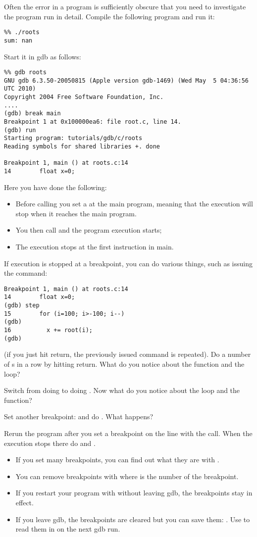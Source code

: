 Often the error in a program is sufficiently obscure that you need to
investigate the program run in detail. Compile the following program
%
%
and run it:
\begin{verbatim}
%% ./roots
sum: nan
\end{verbatim}
Start it in gdb as follows:
\begin{verbatim}
%% gdb roots
GNU gdb 6.3.50-20050815 (Apple version gdb-1469) (Wed May  5 04:36:56 UTC 2010)
Copyright 2004 Free Software Foundation, Inc.
....
(gdb) break main
Breakpoint 1 at 0x100000ea6: file root.c, line 14.
(gdb) run
Starting program: tutorials/gdb/c/roots
Reading symbols for shared libraries +. done

Breakpoint 1, main () at roots.c:14
14        float x=0;
\end{verbatim}
Here you have done the following:
\begin{itemize}
\item Before calling  you set a  at the
  main program, meaning that the execution will stop when it reaches
  the main program.
\item You then call  and the program execution starts;
\item The execution stops at the first instruction in main.
\end{itemize}
If execution is stopped at a breakpoint, you can do various things,
such as issuing the  command:
\begin{verbatim}
Breakpoint 1, main () at roots.c:14
14        float x=0;
(gdb) step
15        for (i=100; i>-100; i--)
(gdb) 
16          x += root(i);
(gdb) 
\end{verbatim}
(if you just hit return, the previously issued command is
repeated). Do a number of s in a row by hitting return. What
do you notice about the function and the loop?

Switch from doing  to doing . Now what do you notice
about the loop and the function? 

Set another breakpoint:  and do . What happens?

Rerun the program after you set a breakpoint on the line with the
 call. When the execution stops there do  and
.

\begin{itemize}
\item If you set many breakpoints, you can find out what they are with
  . 
\item You can remove breakpoints with  where  is the
  number of the breakpoint.
\item If you restart your program with  without leaving gdb,
  the breakpoints stay in effect.
\item If you leave gdb, the breakpoints are cleared but you can save
  them: . Use  to read
  them in on the next gdb run.
\end{itemize}

